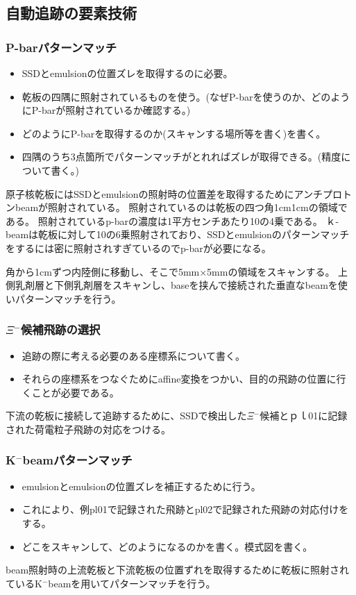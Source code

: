 \documentclass[12pt,a4paper]{jarticle}
\begin{document}
\subsection{自動追跡の要素技術}
\subsubsection{P-barパターンマッチ}
\begin{itemize}
    \item SSDとemulsionの位置ズレを取得するのに必要。
    \item 乾板の四隅に照射されているものを使う。(なぜP-barを使うのか、どのようにP-barが照射されているか確認する。)
    \item どのようにP-barを取得するのか(スキャンする場所等を書く)を書く。
    \item 四隅のうち3点箇所でパターンマッチがとれればズレが取得できる。(精度について書く。)
\end{itemize}
原子核乾板にはSSDとemulsionの照射時の位置差を取得するためにアンチプロトンbeamが照射されている。
照射されているのは乾板の四つ角1cm1cmの領域である。
照射されているp-barの濃度は1平方センチあたり10の4乗である。
ｋ-beamは乾板に対して10の6乗照射されており、SSDとemulsionのパターンマッチをするには密に照射されすぎているのでp-barが必要になる。
\par
角から1cmずつ内陸側に移動し、そこで5mm×5mmの領域をスキャンする。
上側乳剤層と下側乳剤層をスキャンし、baseを挟んで接続された垂直なbeamを使いパターンマッチを行う。
\par
\subsubsection{$\Xi$$^-$候補飛跡の選択}
\begin{itemize}
    \item 追跡の際に考える必要のある座標系について書く。
    \item それらの座標系をつなぐためにaffine変換をつかい、目的の飛跡の位置に行くことが必要である。
\end{itemize}
下流の乾板に接続して追跡するために、SSDで検出した$\Xi$$^-$候補とｐｌ01に記録された荷電粒子飛跡の対応をつける。
\subsubsection{K$^-$beamパターンマッチ}
\begin{itemize}
    \item emulsionとemulsionの位置ズレを補正するために行う。
    \item これにより、例pl01で記録された飛跡とpl02で記録された飛跡の対応付けをする。
    \item どこをスキャンして、どのようになるのかを書く。模式図を書く。
\end{itemize}
beam照射時の上流乾板と下流乾板の位置ずれを取得するために乾板に照射されているK$^-$beamを用いてパターンマッチを行う。
\end{document}
